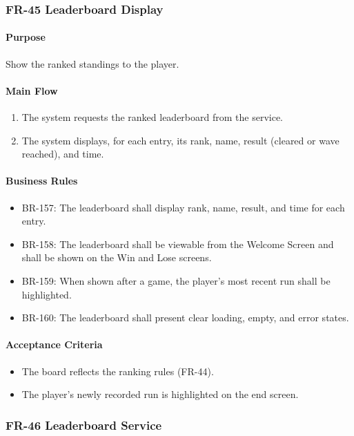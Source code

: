 \documentclass[11pt,a4paper]{article}
\begin{document}
\subsubsection{FR-45 Leaderboard Display}

\paragraph{Purpose}
Show the ranked standings to the player.

\paragraph{Main Flow}
\begin{enumerate}
  \item The system requests the ranked leaderboard from the service.
  \item The system displays, for each entry, its rank, name, result (cleared or
        wave reached), and time.
\end{enumerate}

\paragraph{Business Rules}
\begin{itemize}
  \item BR-157: The leaderboard shall display rank, name, result, and time for
        each entry.
  \item BR-158: The leaderboard shall be viewable from the Welcome Screen and
        shall be shown on the Win and Lose screens.
  \item BR-159: When shown after a game, the player's most recent run shall be
        highlighted.
  \item BR-160: The leaderboard shall present clear loading, empty, and error
        states.
\end{itemize}

\paragraph{Acceptance Criteria}
\begin{itemize}
  \item The board reflects the ranking rules (FR-44).
  \item The player's newly recorded run is highlighted on the end screen.
\end{itemize}

\subsubsection{FR-46 Leaderboard Service}
\end{document}

